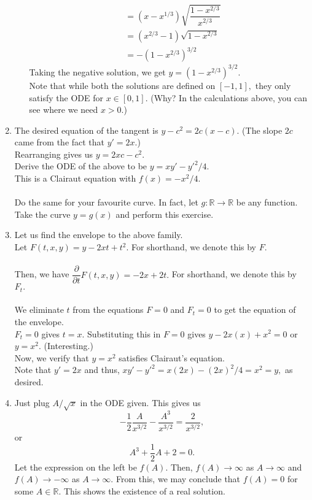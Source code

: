 \documentclass{article}
\begin{document}
\begin{enumerate}[label = Q.\arabic*.]
\begin{enumerate}[label = (\roman*)]
\begin{align*}
			& = (x - x^{1/3})\sqrt{\dfrac{1 - x^{2/3}}{x^{2/3}}}\\
			&= (x^{2/3} - 1)\sqrt{1 - x^{2/3}}\\
			&= -(1 - x^{2/3})^{3/2}
		\end{align*}
		Taking the negative solution, we get $y = (1 - x^{2/3})^{3/2}.$\\
		Note that while both the solutions are defined on $[-1, 1],$ they only satisfy the ODE for $x \in [0, 1].$ \hfill (Why? In the calculations above, you can see where we need $x > 0.$)
	\end{enumerate}
	\item The desired equation of the tangent is $y - c^2 = 2c(x - c).$ (The slope $2c$ came from the fact that $y' = 2x.$)\\
	Rearranging gives us $y = 2xc - c^2.$\\
	Derive the ODE of the above to be $y = xy' - y'^2/4.$\\
	This is a Clairaut equation with $f(x) = -x^2/4.$\\~\\
	Do the same for your favourite curve. In fact, let $g:\mathbb{R}\to\mathbb{R}$ be any function. Take the curve $y = g(x)$ and perform this exercise.
	\item Let us find the envelope to the above family.\\
	Let $F(t, x, y) = y - 2xt + t^2.$ For shorthand, we denote this by $F.$\\~\\
	Then, we have $\dfrac{\partial}{\partial t}F(t, x, y) = -2x + 2t.$ For shorthand, we denote this by $F_t.$\\~\\
	We eliminate $t$ from the equations $F = 0$ and $F_t = 0$ to get the equation of the envelope.\\
	$F_t = 0$ gives $t = x.$ Substituting this in $F = 0$ gives $y - 2x(x) + x^2 = 0$ or $y = x^2.$ \hfill (Interesting.)\\
	Now, we verify that $y = x^2$ satisfies Clairaut's equation.\\
	Note that $y' = 2x$ and thus, $xy' - y'^2 = x(2x) - (2x)^2/4 = x^2 = y,$ as desired.
	\item Just plug $A/\sqrt{x}$ in the ODE given. This gives us
	\[-\frac{1}{2}\frac{A}{x^{3/2}} - \frac{A^3}{x^{3/2}} = \dfrac{2}{x^{3/2}},\]
	or
	\[A^3 + \dfrac{1}{2}A + 2 = 0.\]
	Let the expression on the left be $f(A).$ Then, $f(A) \to \infty$ as $A \to \infty$ and $f(A) \to -\infty$ as $A \to \infty.$ From this, we may conclude that $f(A) = 0$ for some $A \in \mathbb{R}.$ This shows the existence of a real solution.\\

\end{enumerate}
\end{document}
